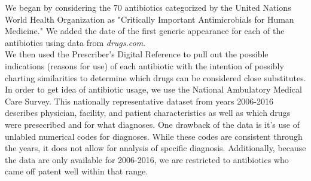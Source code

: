 \documentclass[11pt]{SelfArxOneColBMN}
\begin{document}
\noindent
We began by considering the 70 antibiotics categorized by the United Nations World Health Organization as "Critically Important Antimicrobials for Human Medicine." We added the date of the first generic appearance for each of the antibiotics using data from \textit{drugs.com}.\\

We then used the Prescriber's Digital Reference to pull out the possible indications (reasons for use) of each antibiotic with the intention of possibly charting similarities to determine which drugs can be considered close substitutes.\\

In order to get idea of antibiotic usage, we use the National Ambulatory Medical Care Survey. This nationally representative dataset from years 2006-2016 describes physician, facility, and patient characteristics as well as which drugs were presecribed and for what diagnoses. One drawback of the data is it's use of unlabled numerical codes for diagnoses. While these codes are consistent through the years, it does not allow for analysis of specific diagnosis. Additionally, because the data are only available for 2006-2016, we are restricted to antibiotics who came off patent well within that range.\\
\end{document}
